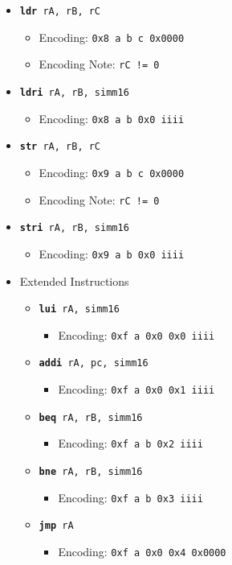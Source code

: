 \documentclass{article}
\begin{document}
\begin{itemize}
		\item \texttt{\textbf{ldr} rA, rB, rC}
		\begin{itemize}
			\item Encoding:  \texttt{0x8 a b c  0x0000}
			\item Encoding Note:  \texttt{rC != 0}
		\end{itemize}
		\item \texttt{\textbf{ldri} rA, rB, simm16}
		\begin{itemize}
			\item Encoding:  \texttt{0x8 a b 0x0  iiii}
		\end{itemize}


		\item \texttt{\textbf{str} rA, rB, rC}
		\begin{itemize}
			\item Encoding:  \texttt{0x9 a b c  0x0000}
			\item Encoding Note:  \texttt{rC != 0}
		\end{itemize}
		\item \texttt{\textbf{stri} rA, rB, simm16}
		\begin{itemize}
			\item Encoding:  \texttt{0x9 a b 0x0  iiii}
		\end{itemize}



		\item Extended Instructions
		\begin{itemize}
			\item \texttt{\textbf{lui} rA, simm16}
			\begin{itemize}
				\item Encoding:  \texttt{0xf a 0x0 0x0  iiii}
			\end{itemize}

			\item \texttt{\textbf{addi} rA, pc, simm16}
			\begin{itemize}
				\item Encoding:  \texttt{0xf a 0x0 0x1  iiii}
			\end{itemize}

			\item \texttt{\textbf{beq} rA, rB, simm16}
			\begin{itemize}
				\item Encoding:  \texttt{0xf a b 0x2  iiii}
			\end{itemize}

			\item \texttt{\textbf{bne} rA, rB, simm16}
			\begin{itemize}
				\item Encoding:  \texttt{0xf a b 0x3  iiii}
			\end{itemize}

			\item \texttt{\textbf{jmp} rA}
			\begin{itemize}
				\item Encoding:  \texttt{0xf a 0x0 0x4  0x0000}
			\end{itemize}
		\end{itemize}
	\end{itemize}


\end{document}
